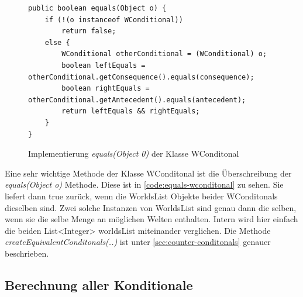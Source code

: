 \documentclass[12pt,a4paper]{article}
\begin{document}
\begin{figure}
\begin{lstlisting}
public boolean equals(Object o) {
    if (!(o instanceof WConditional))
        return false;
    else {
        WConditional otherConditional = (WConditional) o;
        boolean leftEquals = otherConditional.getConsequence().equals(consequence);
        boolean rightEquals = otherConditional.getAntecedent().equals(antecedent);
        return leftEquals && rightEquals;
    }
}
\end{lstlisting}
\caption{Implementierung \textit{equals(Object 0)} der Klasse WConditonal}
\label{code:equals-wconditonal}
\end{figure}


Eine sehr wichtige Methode der Klasse WConditonal ist die Überschreibung der \textit{equals(Object o)} Methode. Diese ist in \autoref{code:equals-wconditonal} zu sehen. Sie liefert dann true zurück, wenn die WorldsList Objekte beider WConditonals dieselben sind. Zwei solche Instanzen von WorldsList sind genau dann die selben, wenn sie die selbe Menge an möglichen Welten enthalten. Intern wird hier einfach die beiden List<Integer> worldsList miteinander verglichen. Die Methode \textit{createEquivalentConditonals(..)} ist unter \autoref{sec:counter-conditonals} genauer beschrieben.


\subsection{Berechnung aller Konditionale}
\end{document}
